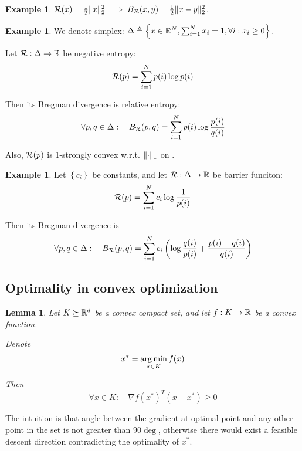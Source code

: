 \documentclass[11pt]{article}
\newtheorem{lemma}[theorem]{Lemma}
\theoremstyle{definition}
\theoremstyle{definition}
\newtheorem{example}[theorem]{Example}
\newcommand{\pth}[1]{\left( #1\right)}                 %
\newcommand{\braces}[1]{\left\lbrace #1\right\rbrace } %
\newcommand{\wrt}{w.r.t.}
\newcommand{\strongcvx}[1]{#1-strongly convex}
\newcommand{\Kset}{\ensuremath{K}}
\begin{document}
\begin{example}
$ \mathcal R(x) = \frac{1}{2} \mathopen\| x \mathclose\|_2^2
\implies 
B_{\mathcal R}(x,y) = \frac{1}{2} \mathopen\| x - y \mathclose\|_2^2 $.
\end{example}

\begin{example}
We denote simplex: $ \simplex \triangleq \braces{ x \in \reals^N, \sum_{i=1}^{N} x_i = 1, \forall i: x_i \geq 0 } $.

Let $ \mathcal R : \Delta \to {\mathbb R} $ be negative entropy: 
$$ \mathcal R(p) = \sum_{i=1}^{N} p(i) \log p(i) $$

Then its Bregman divergence is relative entropy: 
$$\forall p,q \in \Delta:\quad B_{\mathcal R}(p,q) = \sum_{i=1}^{N} p(i) \log \frac{p(i)}{q(i)} $$

Also, $\mathcal R(p)$ is \strongcvx{1} \wrt{} $ \mathopen\| \cdot \mathclose\|_1 $ on \simplex{}.
\end{example}


\begin{example}
Let $ \braces{c_i}$ be constants, and let $ \mathcal R : \Delta \to {\mathbb R} $ be barrier funciton: 
$$ \mathcal R(p) = \sum_{i=1}^{N} c_i \log \frac{1}{p(i)} $$

Then its Bregman divergence is 
$$ \forall p,q \in \simplex:\quad B_\R(p,q) = \sum_{i=1}^{N} { c_i \pth{ \log \frac{q(i)}{p(i)} + \frac{p(i) - q(i)}{q(i)} }} $$
\end{example}

\subsection{Optimality in convex optimization}

\begin{lemma}
Let $\Kset \succeq \reals^d $ be a convex compact set, and let $ f: \Kset \to \reals $ be a convex function.

Denote 
\begin{equation*}
x^* = \argmin_{x \in \Kset} f(x)
\end{equation*}

Then
\begin{equation*}
\forall x \in \Kset: \quad {\nabla f(x^*)}^T (x-x^*) \geq 0
\end{equation*}
\end{lemma}

The intuition is that angle between the gradient at optimal point and any other point in the set is not greater than $90\deg$, otherwise there would exist a feasible descent direction contradicting the optimality of $x^*$.
\end{document}
